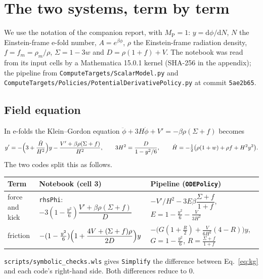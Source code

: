 \documentclass[11pt,a4paper]{article}
\newcommand{\MP}{M_{\mathrm{P}}}
\newcommand{\code}[1]{\texttt{#1}}
\begin{document}
\tableofcontents

\section{The two systems, term by term}
\label{sec:terms}

We use the notation of the companion report, with $\MP = 1$: $y = \mathrm{d}\phi/\mathrm{d}N$,
$N$ the Einstein-frame e-fold number, $A = e^{\beta\phi}$, $\rho$ the Einstein-frame
radiation density, $f = f_m = \rho_m/\rho$, $\Sigma = 1-3w$ and $D = \rho(1+f) + V$. The
notebook was read from its input cells by a Mathematica 15.0.1 kernel (SHA-256 in the
appendix); the pipeline from \code{ComputeTargets/ScalarModel.py} and
\code{ComputeTargets/Policies/PotentialDerivativePolicy.py} at commit \code{5ae2b65}.

\subsection{Field equation}

In e-folds the Klein--Gordon equation $\ddot\phi + 3H\dot\phi + V' = -\beta\rho(\Sigma+f)$
becomes
\begin{equation}
  y' = -\Bigl(3 + \frac{\dot H}{H^2}\Bigr) y - \frac{V' + \beta\rho(\Sigma + f)}{H^2},
  \qquad
  3H^2 = \frac{D}{1 - y^2/6},
  \qquad
  \dot H = -\tfrac12\bigl(\rho(1+w) + \rho f + H^2y^2\bigr).
  \label{eq:kg}
\end{equation}
The two codes split this as follows.
\begin{center}\footnotesize
\begin{tabular}{@{}lll@{}}
\toprule
Term & Notebook (cell 3) & Pipeline (\code{ODEPolicy}) \\
\midrule
force and kick & \code{rhsPhi}: $-3(1-\tfrac{y^2}{6})\dfrac{V' + \beta\rho(\Sigma+f)}{D}$ &
  $-V'/H^2 - 3E\beta\dfrac{\Sigma+f}{1+f}$, $E = 1-\tfrac{y^2}{6} - \tfrac{V}{3H^2}$ \\[2ex]
friction & $-(1-\tfrac{y^2}{6})\Bigl(1 + \dfrac{4V + (\Sigma+f)\rho}{2D}\Bigr)y$ &
  $-\bigl(G(1 + \tfrac R2) + \tfrac{V}{6H^2}(4-R)\bigr)y$, $G = 1-\tfrac{y^2}{6}$, $R = \tfrac{\Sigma+f}{1+f}$ \\
\bottomrule
\end{tabular}
\end{center}
\code{scripts/symbolic\_checks.wls} gives \code{Simplify} the difference between
Eq.~\eqref{eq:kg} and each code's right-hand side. Both differences reduce to $0$.
\end{document}
